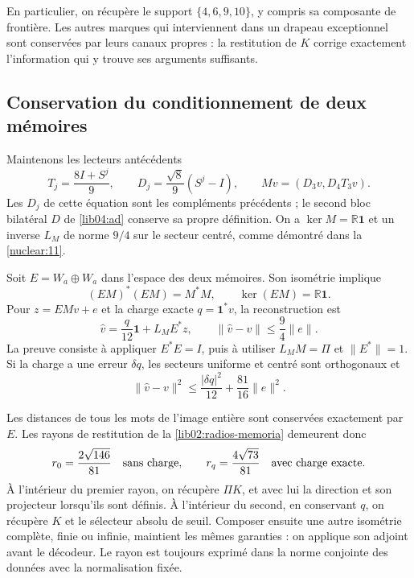 En particulier, on récupère le support \(\{4,6,9,10\}\), y compris
sa composante de frontière. Les autres marques qui interviennent dans un
drapeau exceptionnel sont conservées par leurs canaux propres : la
restitution de \(K\) corrige exactement l’information qui y trouve
ses arguments suffisants.

\subsection{Conservation du conditionnement de deux mémoires}
\label{lib04:dos-memorias}

Maintenons les lecteurs antécédents
\begin{equation}
 T_j=\frac{8I+S^j}{9},\qquad
 D_j=\frac{\sqrt8}{9}(S^j-I),\qquad
 Mv=(D_3v,D_4T_3v).
 \label{lib04:m-antecedente}
\end{equation}
Les \(D_j\) de cette équation sont les compléments précédents ; le second bloc bilatéral \(D\) de \eqref{lib04:ad} conserve sa propre définition. On a \(\ker M=\mathbb R\mathbf1\) et un inverse \(L_M\) de norme \(9/4\) sur le secteur centré, comme démontré dans la \cref{nuclear:11}.

Soit \(E=W_a\oplus W_a\) dans l’espace des deux mémoires.
Son isométrie implique
\begin{equation}
 (EM)^*(EM)=M^*M,\qquad
 \ker(EM)=\mathbb R\mathbf1.
 \label{lib04:gram-m-preservado}
\end{equation}
Pour \(z=EMv+e\) et la charge exacte
\(q=\mathbf1^*v\), la reconstruction est
\begin{equation}
 \widehat v=\frac q{12}\mathbf1+L_ME^*z,\qquad
 \|\widehat v-v\|\leq\frac94\|e\|.
 \label{lib04:inversa-m}
\end{equation}
La preuve consiste à appliquer \(E^*E=I\), puis à utiliser
\(L_MM=\Pi\) et \(\|E^*\|=1\). Si la charge a une erreur
\(\delta q\), les secteurs uniforme et centré sont orthogonaux et
\begin{equation}
 \|\widehat v-v\|^2
 \leq\frac{|\delta q|^2}{12}+\frac{81}{16}\|e\|^2.
 \label{lib04:error-carga}
\end{equation}

Les distances de tous les mots de l’image entière sont conservées
exactement par \(E\). Les rayons de restitution de
la \cref{lib02:radios-memoria} demeurent donc
\begin{equation}
 r_0=\frac{2\sqrt{146}}{81}\quad\hbox{sans charge},\qquad
 r_q=\frac{4\sqrt{73}}{81}\quad\hbox{avec charge exacte}.
 \label{lib04:radios}
\end{equation}
À l'intérieur du premier rayon, on récupère \(\Pi K\), et avec lui la direction et son projecteur lorsqu'ils sont définis. À l'intérieur du second, en conservant \(q\), on récupère \(K\) et le sélecteur absolu de seuil. Composer ensuite une autre isométrie complète, finie ou infinie, maintient les mêmes garanties : on applique son adjoint avant le décodeur. Le rayon est toujours exprimé dans la norme conjointe des données avec la normalisation fixée.

